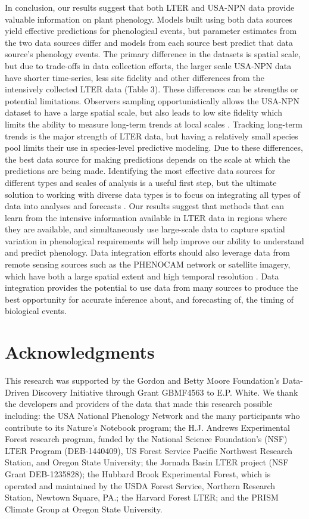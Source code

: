 \documentclass[fleqn,12pt,lineno]{article}
\begin{document}
In conclusion, our results suggest that both LTER and USA-NPN data provide valuable information on plant phenology. Models built using both data sources yield effective predictions for phenological events, but parameter estimates from the two data sources differ and models from each source best predict that data source's phenology events. The primary difference in the datasets is spatial scale, but due to trade-offs in data collection efforts, the larger scale USA-NPN data have shorter time-series, less site fidelity and other differences from the intensively collected LTER data (Table 3). These differences can be strengths or potential limitations. Observers sampling opportunistically allows the USA-NPN dataset to have a large spatial scale, but also leads to low site fidelity which limits the ability to measure long-term trends at local scales \citep{gerst2016}. Tracking long-term trends is the major strength of LTER data, but having a relatively small species pool limits their use in species-level predictive modeling. Due to these differences, the best data source for making predictions depends on the scale at which the predictions are being made. Identifying the most effective data sources for different types and scales of analysis is a useful first step, but the ultimate solution to working with diverse data types is to focus on integrating all types of data into analyses and forecasts \citep{hanks2018, melaas2016}. Our results suggest that methods that can learn from the intensive information available in LTER data in regions where they are available, and simultaneously use large-scale data to capture spatial variation in phenological requirements will help improve our ability to understand and predict phenology. Data integration efforts should also leverage data from remote sensing sources such as the PHENOCAM network or satellite imagery, which have both a large spatial extent and high temporal resolution \citep{peng2017,richardson2018a,richardson2018b}. Data integration provides the potential to use data from many sources to produce the best opportunity for accurate inference about, and forecasting of, the timing of biological events.


\section*{Acknowledgments}

This research was supported by the Gordon and Betty Moore Foundation’s Data-Driven Discovery Initiative through Grant GBMF4563 to E.P. White. We thank the developers and providers of the data that made this research possible including: the USA National Phenology Network and the many participants who contribute to its Nature’s Notebook program; the H.J. Andrews Experimental Forest research program, funded by the National Science Foundation's (NSF) LTER Program (DEB-1440409), US Forest Service Pacific Northwest Research Station, and Oregon State University; the Jornada Basin LTER project (NSF Grant DEB-1235828); the Hubbard Brook Experimental Forest, which is operated and maintained by the USDA Forest Service, Northern Research Station, Newtown Square, PA.; the Harvard Forest LTER; and the PRISM Climate Group at Oregon State University.
\end{document}
